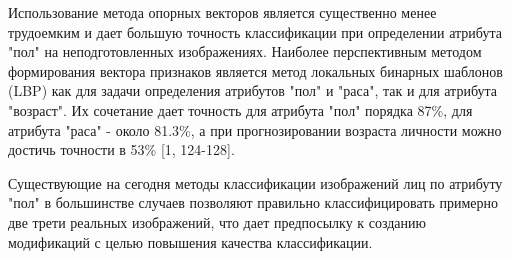 \documentclass[12pt,a4paper]{article}
\begin{document}
Использование метода опорных векторов является существенно менее трудоемким и дает большую точность классификации при определении атрибута "пол" на неподготовленных изображениях. Наиболее перспективным методом формирования вектора признаков является метод локальных бинарных шаблонов (LBP) как для задачи определения
атрибутов "пол" и "раса", так и для атрибута "возраст". Их сочетание дает точность для атрибута "пол" порядка 87\%, для атрибута "раса" - около 81.3\%, а при прогнозировании возраста личности можно достичь точности в 53\% [1, 124-128].

Существующие на сегодня методы классификации изображений лиц по атрибуту "пол" в большинстве случаев позволяют правильно классифицировать примерно две трети реальных изображений, что дает предпосылку к созданию модификаций с целью повышения качества классификации.
\end{document}
